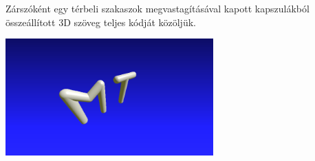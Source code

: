 Zárszóként egy térbeli szakaszok megvastagításával kapott kapszulákból
összeállított 3D szöveg teljes kódját közöljük.


\begin{center}
\includegraphics[width=8cm]{images/final.png}
\end{center}



